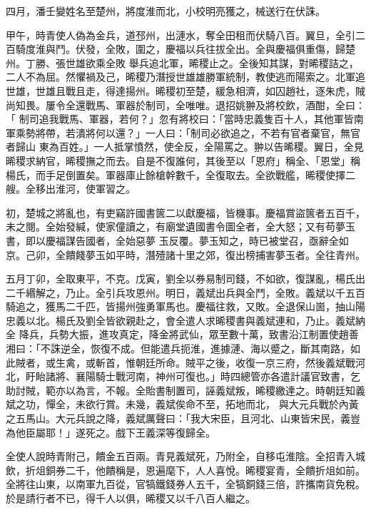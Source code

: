 \begin{pinyinscope}
 四月，潘壬變姓名至楚州，將度淮而北，小校明亮獲之，械送行在伏誅。



 甲午，時青使人偽為金兵，道邳州，出漣水，奪全田租而伏騎八百。翼旦，全引二百騎度淮與鬥。伏發，全敗，圍之，慶福以兵往拔全出。全與慶福俱重傷，歸楚州。丁勝、張世雄欲乘全敗
 舉兵追北軍，晞稷止之。全後知其謀，對晞稷詰之，二人不為屈。然懼禍及己，晞稷乃潛授世雄雄勝軍統制，教使逃而陽索之。北軍追世雄，世雄且戰且走，得達揚州。晞稷初至楚，緩急相濟，如囚趙社，逐朱虎，賊尚知畏。屢令全還戰馬、軍器於制司，全唯唯。退招姚翀及將校飲，酒酣，全曰：「 制司追我戰馬、軍器，若何？」忽有將校曰：「當時忠義隻百十人，其他軍皆南軍乘勢將帶，若潰將何以還？」一人曰：「制司必欲追之，不若有官者棄官，無官者歸山
 東為百姓。」一人抵掌憤然，使全反，全陽罵之。翀以告晞稷。翼日，全見晞稷求納官，晞稷撫之而去。自是不復誰何，其後至以「恩府」稱全、「恩堂」稱楊氏，而手足倒置矣。軍器庫止餘槍幹數千，全復取去。全欲戰艦，晞稷使擇二艘。全移出淮河，使軍習之。



 初，楚城之將亂也，有吏竊許國書篋二以獻慶福，皆機事。慶福賞盜篋者五百千，未之閱。全始發緘，使家僮讀之，有廟堂遺國書令圖全者，全大怒；又有苟夢玉書，即以慶福謀告國者，全始惡夢
 玉反覆。夢玉知之，時已被堂召，亟辭全如京。己卯，全饋餞夢玉如平時，潛殪諸十里之郊，復出榜捕害夢玉者。全往青州。



 五月丁卯，全取東平，不克。戊寅，劉全以券易制司錢，不如欲，復謀亂，楊氏出二千緡解之，乃止。全引兵攻恩州。明日，義斌出兵與全鬥，全敗。義斌以千五百騎追之，獲馬二千匹，皆揚州強勇軍馬也。慶福往救，又敗。全退保山崮，抽山陽忠義以北。楊氏及劉全皆欲親赴之，會全遣人求晞稷書與義斌連和，乃止。義斌納全
 降兵，兵勢大振，進攻真定，降金將武仙，眾至數十萬，致書沿江制置使趙善湘曰：「不誅逆全，恢復不成。但能遣兵扼淮，進據漣、海以蹙之，斷其南路，如此賊者，或生禽，或斬首，惟朝廷所命。賊平之後，收復一京三府，然後義斌戰河北，盱眙諸將、襄陽騎士戰河南，神州可復也。」時四總管亦各遣計議官致書，乞助討賊，範亦以為言，不報。全貽書制置司，誣義斌叛，晞稷繳達之。時朝廷知義斌之功，憚全，未欲行賞。未幾，義斌俟命不至，拓地而北，
 與大元兵戰於內黃之五馬山。大元兵說之降，義斌厲聲曰：「我大宋臣，且河北、山東皆宋民，義豈為他臣屬耶！」遂死之。戲下王義深等復歸全。



 全使人說時青附己，饋金五百兩。青見義斌死，乃附全，自移屯淮陰。全招青入城飲，折俎銅券二千，他饋稱是，恩遍麾下，人人喜悅。晞稷宴青，全饋折俎如前。全將往山東，以南軍九百從，官犒鐵錢券人五千，全犒銅錢三倍，許攜南貨免稅。於是請行者不已，得千人以俱，晞稷又以千八百人繼之。




\end{pinyinscope}
